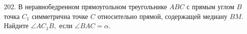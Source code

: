 202. В неравнобедренном прямоугольном треугольнике $ABC$ с прямым углом $B$ точка $C_1$ симметрична точке $C$ относительно прямой, содержащей медиану $BM.$ Найдите $\angle AC_1B,$ если $\angle BAC=\alpha.$\\
